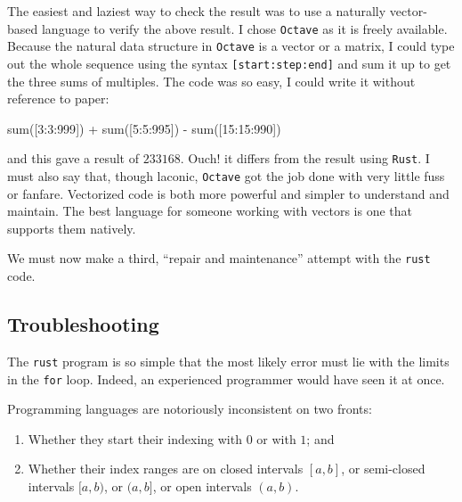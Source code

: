 \documentclass[
  a4paper,
]{article}
\newenvironment{Shaded}{\begin{snugshade}}{\end{snugshade}}
\newcommand{\FloatTok}[1]{\textcolor[rgb]{0.75,0.75,0.82}{#1}}
\newcommand{\FunctionTok}[1]{\textcolor[rgb]{0.94,0.94,0.56}{#1}}
\newcommand{\NormalTok}[1]{\textcolor[rgb]{0.80,0.80,0.80}{#1}}
\newcommand{\OperatorTok}[1]{\textcolor[rgb]{0.94,0.94,0.82}{#1}}
\providecommand{\tightlist}{%
  \setlength{\itemsep}{0pt}\setlength{\parskip}{0pt}}
\begin{document}
The easiest and laziest way to check the result was to use a naturally
vector-based language to verify the above result. I chose
\texttt{Octave} as it is freely available. Because the natural data
structure in \texttt{Octave} is a vector or a matrix, I could type out
the whole sequence using the syntax \texttt{{[}start:step:end{]}} and
sum it up to get the three sums of multiples. The code was so easy, I
could write it without reference to paper:

\begin{Shaded}
\begin{Highlighting}[]
\FunctionTok{sum}\NormalTok{([}\FloatTok{3}\OperatorTok{:}\FloatTok{3}\OperatorTok{:}\FloatTok{999}\NormalTok{]) }\OperatorTok{+} \FunctionTok{sum}\NormalTok{([}\FloatTok{5}\OperatorTok{:}\FloatTok{5}\OperatorTok{:}\FloatTok{995}\NormalTok{]) }\OperatorTok{{-}} \FunctionTok{sum}\NormalTok{([}\FloatTok{15}\OperatorTok{:}\FloatTok{15}\OperatorTok{:}\FloatTok{990}\NormalTok{])}
\end{Highlighting}
\end{Shaded}

and this gave a result of \(233168\). Ouch! it differs from the result
using \texttt{Rust}. I must also say that, though laconic,
\texttt{Octave} got the job done with very little fuss or fanfare.
Vectorized code is both more powerful and simpler to understand and
maintain. The best language for someone working with vectors is one that
supports them natively.

We must now make a third, ``repair and maintenance'' attempt with the
\texttt{rust} code.

\hypertarget{troubleshooting}{%
\subsection{Troubleshooting}\label{troubleshooting}}

The \texttt{rust} program is so simple that the most likely error must
lie with the limits in the \texttt{for} loop. Indeed, an experienced
programmer would have seen it at once.

Programming languages are notoriously inconsistent on two fronts:

\begin{enumerate}
\def\labelenumi{\alph{enumi}.}
\tightlist
\item
  Whether they start their indexing with \(0\) or with \(1\); and
\item
  Whether their index ranges are on closed intervals \([a, b]\), or
  semi-closed intervals \([a, b)\), or \((a, b]\), or open intervals
  \((a, b).\)
\end{enumerate}
\end{document}
